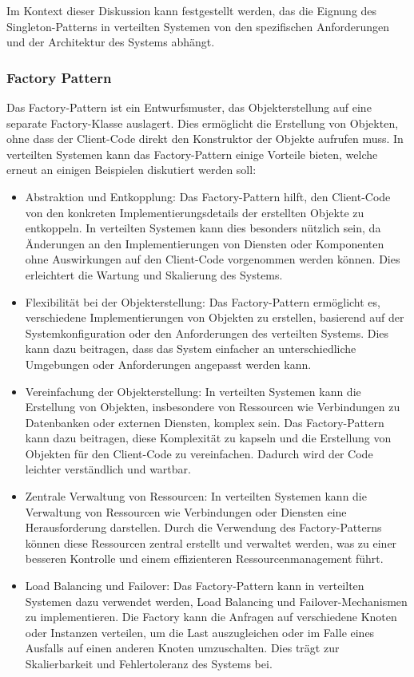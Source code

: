 \documentclass[../vs-script-first-v01.tex]{subfiles}
\begin{document}
Im Kontext dieser Diskussion kann festgestellt werden, das die Eignung des Singleton-Patterns in verteilten Systemen von den spezifischen Anforderungen und der Architektur des Systems abhängt. 

\subsubsection{Factory Pattern}
Das Factory-Pattern ist ein Entwurfsmuster, das Objekterstellung auf eine separate Factory-Klasse auslagert. Dies ermöglicht die Erstellung von Objekten, ohne dass der Client-Code direkt den Konstruktor der Objekte aufrufen muss. In verteilten Systemen kann das Factory-Pattern einige Vorteile bieten, welche erneut an einigen Beispielen diskutiert werden soll:
\begin{itemize}
\item Abstraktion und Entkopplung: Das Factory-Pattern hilft, den Client-Code von den konkreten Implementierungsdetails der erstellten Objekte zu entkoppeln. In verteilten Systemen kann dies besonders nützlich sein, da Änderungen an den Implementierungen von Diensten oder Komponenten ohne Auswirkungen auf den Client-Code vorgenommen werden können. Dies erleichtert die Wartung und Skalierung des Systems.
\item Flexibilität bei der Objekterstellung: Das Factory-Pattern ermöglicht es, verschiedene Implementierungen von Objekten zu erstellen, basierend auf der Systemkonfiguration oder den Anforderungen des verteilten Systems. Dies kann dazu beitragen, dass das System einfacher an unterschiedliche Umgebungen oder Anforderungen angepasst werden kann.
\item Vereinfachung der Objekterstellung: In verteilten Systemen kann die Erstellung von Objekten, insbesondere von Ressourcen wie Verbindungen zu Datenbanken oder externen Diensten, komplex sein. Das Factory-Pattern kann dazu beitragen, diese Komplexität zu kapseln und die Erstellung von Objekten für den Client-Code zu vereinfachen. Dadurch wird der Code leichter verständlich und wartbar.
\item Zentrale Verwaltung von Ressourcen: In verteilten Systemen kann die Verwaltung von Ressourcen wie Verbindungen oder Diensten eine Herausforderung darstellen. Durch die Verwendung des Factory-Patterns können diese Ressourcen zentral erstellt und verwaltet werden, was zu einer besseren Kontrolle und einem effizienteren Ressourcenmanagement führt.
\item Load Balancing und Failover: Das Factory-Pattern kann in verteilten Systemen dazu verwendet werden, Load Balancing und Failover-Mechanismen zu implementieren. Die Factory kann die Anfragen auf verschiedene Knoten oder Instanzen verteilen, um die Last auszugleichen oder im Falle eines Ausfalls auf einen anderen Knoten umzuschalten. Dies trägt zur Skalierbarkeit und Fehlertoleranz des Systems bei.
\end{itemize}
\end{document}
